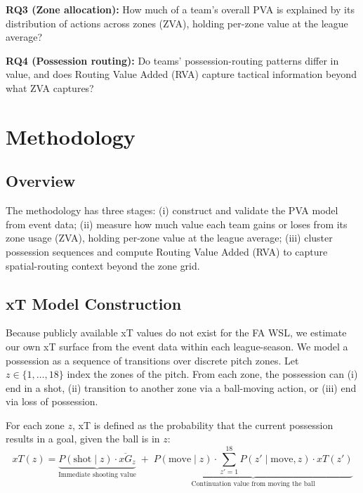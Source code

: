 \documentclass[12pt,a4paper]{article}
\begin{document}
\textbf{RQ3 (Zone allocation):} How much of a team’s overall PVA is explained by its distribution of actions across zones (ZVA), holding per-zone value at the league average?

\textbf{RQ4 (Possession routing):} Do teams’ possession-routing patterns differ in value, and does Routing Value Added (RVA) capture tactical information beyond what ZVA captures?

\section{Methodology}

\subsection{Overview}
The methodology has three stages: (i) construct and validate the PVA model from event data; (ii) measure how much value each team gains or loses from its zone usage (ZVA), holding per-zone value at the league average; (iii) cluster possession sequences and compute Routing Value Added (RVA) to capture spatial-routing context beyond the zone grid.

\subsection{xT Model Construction}
Because publicly available xT values do not exist for the FA WSL, we estimate our own xT surface from the event data within each league-season. We model a possession as a sequence of transitions over discrete pitch zones. Let $z \in \{1,\dots,18\}$ index the zones of the pitch. From each zone, the possession can (i) end in a shot, (ii) transition to another zone via a ball-moving action, or (iii) end via loss of possession.

For each zone $z$, xT is defined as the probability that the current possession results in a goal, given the ball is in $z$:
\begin{equation}
xT(z)
=
\underbrace{
P(\text{shot}\mid z)\cdot \overline{xG}_z
}_{\text{Immediate shooting value}}
\;+\;
\underbrace{
P(\text{move}\mid z)\cdot \sum_{z'=1}^{18} P(z' \mid \text{move}, z)\cdot xT(z')
}_{\text{Continuation value from moving the ball}}
\end{equation}
\end{document}
